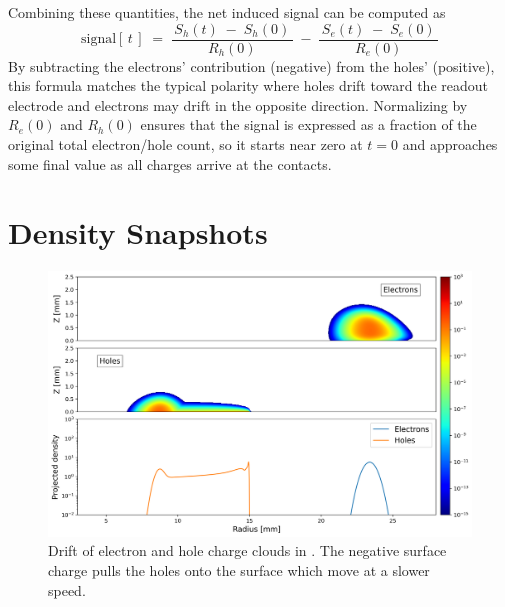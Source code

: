 Combining these quantities, the net induced signal can be computed as
\begin{equation}
\text{signal}[\,t\,] 
\;=\;
  \frac{\,S_h(t)\;-\;S_h(0)\,}{\,R_{h}(0)\,}
  \;-\;
  \frac{\,S_e(t)\;-\;S_e(0)\,}{\,R_{e}(0)\,}
\label{eq:net-signal}
\end{equation}
By subtracting the electrons’ contribution 
(negative) from the holes’ (positive), this formula matches the typical polarity 
where holes drift toward the readout electrode and electrons may drift in the 
opposite direction. Normalizing by $R_{e}(0)$ and $R_{h}(0)$ ensures that the 
signal is expressed as a fraction of the original total electron/hole count, 
so it starts near zero at $t=0$ and approaches some final value as all charges 
arrive at the contacts.



\section{Density Snapshots}
\begin{figure}[!htb]
    \includegraphics[trim={0cm 0 0cm 0},clip,width=0.99\linewidth]{ch3/figs/drift_path_sc=-0.3.png}
    \caption{Drift of electron and hole charge clouds in {\tdsim}. The negative surface charge pulls the holes onto the surface which move at a slower speed.}
    \label{ch3:fig:ehd_path_pd_sc-0.3}
\end{figure}

